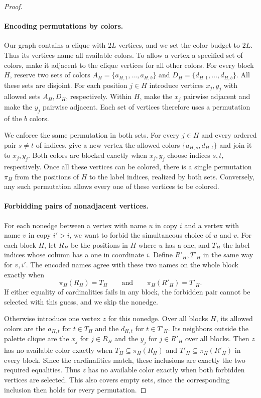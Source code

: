 \documentclass[11pt]{article}
\begin{document}
\begin{proof}
\paragraph{Encoding permutations by colors.}
Our graph contains a clique with \(2L\) vertices, and we set the color
budget to \(2L\). Thus its vertices name all available colors. To allow
a vertex a specified set of colors, make it adjacent to the clique
vertices for all other colors. For every block \(H\), reserve two sets
of colors \(A_H=\{a_{H,1},\ldots,a_{H,b}\}\) and
\(D_H=\{d_{H,1},\ldots,d_{H,b}\}\). All these sets are disjoint.
For each position \(j\in H\) introduce vertices \(x_j,y_j\) with
allowed sets \(A_H,D_H\), respectively. Within \(H\), make the
\(x_j\) pairwise adjacent and make the \(y_j\) pairwise adjacent.
Each set of vertices therefore uses a permutation of the \(b\) colors.

We enforce the same permutation in both sets. For every \(j\in H\)
and every ordered pair \(s\ne t\) of indices, give a new vertex the
allowed colors \(\{a_{H,s},d_{H,t}\}\) and join it to \(x_j,y_j\).
Both colors are blocked exactly when \(x_j,y_j\) choose indices
\(s,t\), respectively. Once all these vertices can be colored, there
is a single permutation \(\pi_H\) from the positions of \(H\) to the
label indices, realized by both sets. Conversely, any such permutation
allows every one of these vertices to be colored.

\paragraph{Forbidding pairs of nonadjacent vertices.}
For each nonedge between a vertex with name \(u\) in copy \(i\) and a
vertex with name \(v\) in copy \(i'>i\), we want to forbid the
simultaneous choice of \(u\) and \(v\). For each block \(H\), let
\(R_H\) be the positions in \(H\) where \(u\) has a one, and
\(T_H\) the label indices whose column has a one in coordinate \(i\).
Define \(R'_H,T'_H\) in the same way for \(v,i'\).
The encoded names agree with these two names on the whole block
exactly when
\[
   \pi_H(R_H)=T_H \qquad\text{and}\qquad \pi_H(R'_H)=T'_H .
\]
If either equality of cardinalities fails in any block, the forbidden
pair cannot be selected with this guess, and we skip the nonedge.

Otherwise introduce one vertex \(z\) for this nonedge. Over all
blocks \(H\), its allowed colors are the \(a_{H,t}\) for \(t\in T_H\)
and the \(d_{H,t}\) for \(t\in T'_H\). Its neighbors outside the
palette clique are the \(x_j\) for \(j\in R_H\) and the \(y_j\) for
\(j\in R'_H\) over all blocks. Then \(z\) has no available color
exactly when \(T_H\subseteq\pi_H(R_H)\) and
\(T'_H\subseteq\pi_H(R'_H)\) in every block. Since the cardinalities
match, these inclusions are exactly the two required equalities.
Thus \(z\) has no available color exactly when both forbidden
vertices are selected. This also covers empty sets, since the
corresponding inclusion then holds for every permutation.


\end{proof}
\end{document}
